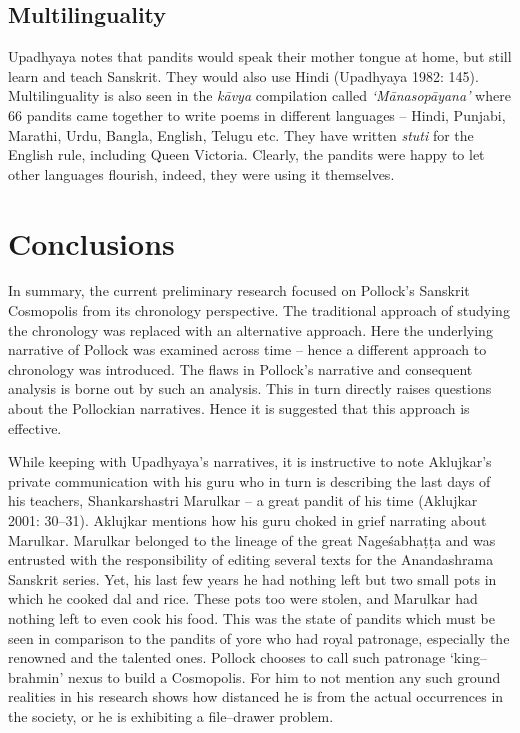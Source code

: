\subsection*{Multilinguality}

Upadhyaya notes that pandits would speak their mother tongue at home, but still learn and teach Sanskrit. They would also use Hindi (Upadhyaya 1982: 145). Multilinguality is also seen in the \textit{kāvya} compilation called \textit{‘Mānasopāyana’} where 66 pandits came together to write poems in different languages – Hindi, Punjabi, Marathi, Urdu, Bangla, English, Telugu etc. They have written \textit{stuti} for the English rule, including Queen Victoria. Clearly, the pandits were happy to let other languages flourish, indeed, they were using it themselves.


\section*{Conclusions}

In summary, the current preliminary research focused on Pollock’s Sanskrit Cosmopolis from its chronology perspective. The traditional approach of studying the chronology was replaced with an alternative approach. Here the underlying narrative of Pollock was examined across time – hence a different approach to chronology was introduced. The flaws in Pollock’s narrative and consequent analysis is borne out by such an analysis. This in turn directly raises questions about the Pollockian narratives. Hence it is suggested that this approach is effective.

While keeping with Upadhyaya’s narratives, it is instructive to note Aklujkar’s private communication with his guru who in turn is describing the last days of his teachers, Shankarshastri Marulkar – a great pandit of his time (Aklujkar 2001: 30–31). Aklujkar mentions how his guru choked in grief narrating about Marulkar. Marulkar belonged to the lineage of the great Nageśabhaṭṭa and was entrusted with the responsibility of editing several texts for the Anandashrama Sanskrit series. Yet, his last few years he had nothing left but two small pots in which he cooked dal and rice. These pots too were stolen, and Marulkar had nothing left to even cook his food. This was the state of pandits which must be seen in comparison to the pandits of yore who had royal patronage, especially the renowned and the talented ones. Pollock chooses to call such patronage ‘king–brahmin’ nexus to build a Cosmopolis. For him to not mention any such ground realities in his research shows how distanced he is from the actual occurrences in the society, or he is exhibiting a file–drawer problem.

